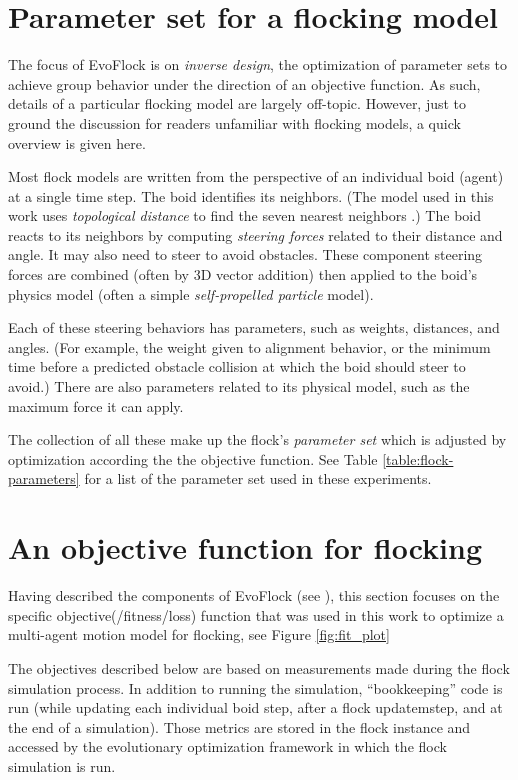 \documentclass[letterpaper]{article}
\begin{document}
\section{Parameter set for a flocking model}
\label{sec:parameter_set}

The focus of EvoFlock is on \textit{inverse design}, the optimization of parameter sets to achieve group behavior under the direction of an objective function. As such, details of a particular flocking model are largely off-topic. However, just to ground the discussion for readers unfamiliar with flocking models, a quick overview is given here.

Most flock models are written from the perspective of an individual boid (agent) at a single time step. The boid identifies its neighbors. (The model used in this work uses \textit{topological distance} to find the seven nearest neighbors \citep{cavagna_seventh_2008}.) The boid reacts to its neighbors by computing \textit{steering forces} related to their distance and angle. It may also need to steer to avoid obstacles. These component steering forces are combined (often by 3D vector addition) then applied to the boid's physics model (often a simple \textit{self-propelled particle} model).

Each of these steering behaviors has parameters, such as weights, distances, and angles. (For example, the weight given to alignment behavior, or the minimum time before a predicted obstacle collision at which the boid should steer to avoid.) There are also parameters related to its physical model, such as the maximum force it can apply.

The collection of all these make up the flock's \textit{parameter set} which is adjusted by optimization according the the objective function. See Table \ref{table:flock-parameters} for a list of the parameter set used in these experiments.

\section{An objective function for flocking}
\label{sec:FlockingObjective}

Having described the components of EvoFlock (see ), this section focuses on the specific objective(/fitness/loss) function that was used in this work to optimize a multi-agent motion model for flocking, see Figure \ref{fig:fit_plot}

The objectives described below are based on measurements made during the flock simulation process. In addition to running the simulation, ``bookkeeping'' code is run (while updating each individual boid step, after a flock updatemstep, and at the end of a simulation). Those metrics are stored in the flock instance and accessed by the evolutionary optimization framework in which the flock simulation is run.
\end{document}

